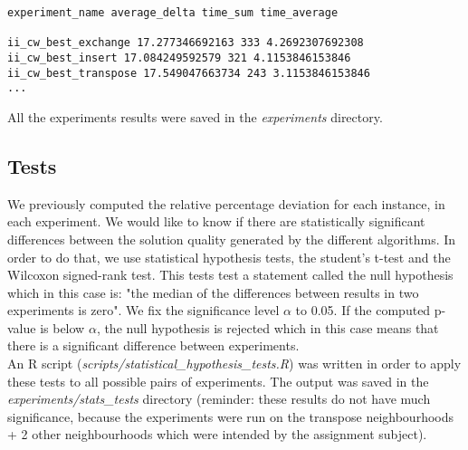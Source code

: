 \begin{lstlisting}
experiment_name average_delta time_sum time_average

ii_cw_best_exchange 17.277346692163 333 4.2692307692308
ii_cw_best_insert 17.084249592579 321 4.1153846153846
ii_cw_best_transpose 17.549047663734 243 3.1153846153846
...
\end{lstlisting}

\begin{framehint}
    All the experiments results were saved in the \emph{experiments} directory.
\end{framehint}

\newpage

\subsection{Tests}
We previously computed the relative percentage deviation for each instance, in
each experiment. We would like to know if there are statistically significant
differences between the solution quality generated by the different algorithms.
In order to do that, we use statistical hypothesis tests, the student's t-test
and the Wilcoxon signed-rank test. This tests test a statement called the
null hypothesis which in this case is: "the median of the differences between
results in two experiments is zero". We fix the significance level $\alpha$ to
0.05. If the computed p-value is below $\alpha$, the null hypothesis is rejected
which in this case means that there is a significant difference between
experiments.\\

An R script (\emph{scripts/statistical\_hypothesis\_tests.R}) was written in order
to apply these tests to all possible pairs of experiments. The output was saved
in the \emph{experiments/stats\_tests} directory (reminder: these
results do not have much significance, because the experiments were run on
the transpose neighbourhoods + 2 other neighbourhoods which were intended by the
assignment subject).\\

